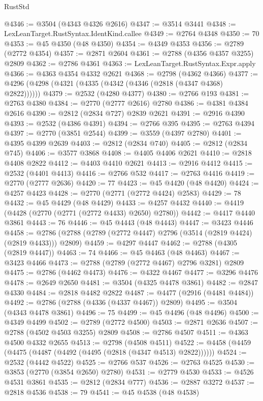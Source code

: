\begin{lexlean}{RustStd}
\begin{coremodule}
@4346 := @3504 (@4343 @4326 @2616)
@4347 := @3514 @3441
@4348 := LexLeanTarget.RustSyntax.IdentKind.callee
@4349 := @2764 @4348
@4350 := 70
@4353 := @45 @4350 (@48 @4350)
@4354 := @4349 @4353
@4356 := @2789 (@2772 @4354)
@4357 := @2871 @2604
@4361 := @2788 (@4356 @4357 @3255) @2809
@4362 := @2786 @4361
@4363 := LexLeanTarget.RustSyntax.Expr.apply
@4366 := @4363 @4354 @4332 @2621
@4368 := @2798 (@4362 @4366)
@4377 := @4296 (@4298 (@4321 (@4335 (@4342 (@4346 (@2818 (@4347 @4368) @2822))))))
@4379 := @2532 (@4280 @4377)
@4380 := @2766 @193
@4381 := @2763 @4380
@4384 := @2770 (@2777 @2616) @2780
@4386 := @4381 @4384 @2616
@4390 := @2812 (@2834 @727) @2839 @2621
@4391 := @2916 @4390
@4393 := @2532 (@4386 @4391)
@4394 := @2766 @395
@4395 := @2763 @4394
@4397 := @2770 (@3851 @2544)
@4399 := @3559 (@4397 @2780)
@4401 := @4395 @4399 @2639
@4403 := @2812 (@2834 @740)
@4405 := @2812 (@2834 @745)
@4406 := @3577 @3868
@4408 := @4405 @4406 @2621
@4410 := @2818 @4408 @2822
@4412 := @4403 @4410 @2621
@4413 := @2916 @4412
@4415 := @2532 (@4401 @4413)
@4416 := @2766 @532
@4417 := @2763 @4416
@4419 := @2770 (@2777 @2636)
@4420 := 77
@4423 := @45 @4420 (@48 @4420)
@4424 := @4257 @4423
@4428 := @2770 (@2771 (@2772 @4424) @2583)
@4429 := 78
@4432 := @45 @4429 (@48 @4429)
@4433 := @4257 @4432
@4440 := @4419 (@4428 (@2770 (@2771 (@2772 @4433) @2650) @2780))
@4442 := @4417 @4440 @3861
@4443 := 76
@4446 := @45 @4443 (@48 @4443)
@4447 := @3423 @4446
@4458 := @2786 (@2788 (@2789 (@2772 @4447) @2796 (@3514 (@2819 @4424) (@2819 @4433))) @2809)
@4459 := @4297 @4447
@4462 := @2788 (@4305 (@2819 @4447))
@4463 := 74
@4466 := @45 @4463 (@48 @4463)
@4467 := @3423 @4466
@4473 := @2788 (@2789 (@2772 @4467) @2796 @3281) @2809
@4475 := @2786 (@4462 @4473)
@4476 := @4322 @4467
@4477 := @3296 @4476
@4478 := @2649 @2650
@4481 := @3504 (@4325 @4478 @3861)
@4482 := @2847 @4330
@4484 := @2818 @4482 @2822
@4487 := @4477 (@2916 (@4481 @4484))
@4492 := @2786 (@2788 (@4336 (@4337 @4467)) @2809)
@4495 := @3504 (@4343 @4478 @3861)
@4496 := 75
@4499 := @45 @4496 (@48 @4496)
@4500 := @4349 @4499
@4502 := @2789 (@2772 @4500)
@4503 := @2871 @2636
@4507 := @2788 (@4502 @4503 @3255) @2809
@4508 := @2786 @4507
@4511 := @4363 @4500 @4332 @2655
@4513 := @2798 (@4508 @4511)
@4522 := @4458 (@4459 (@4475 (@4487 (@4492 (@4495 (@2818 (@4347 @4513) @2822))))))
@4524 := @2532 (@4442 @4522)
@4525 := @2766 @537
@4526 := @2763 @4525
@4530 := @3853 (@2770 (@3854 @2650) @2780)
@4531 := @2779 @4530
@4533 := @4526 @4531 @3861
@4535 := @2812 (@2834 @777)
@4536 := @2887 @3272
@4537 := @2818 @4536
@4538 := 79
@4541 := @45 @4538 (@48 @4538)

\end{coremodule}
\end{lexlean}
